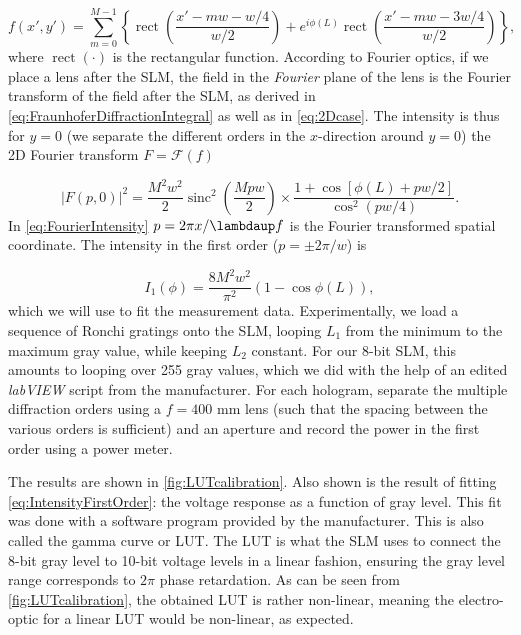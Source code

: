 \begin{equation}\label{eq:FieldAfterSLM}
    f(x',y') = \sum_{m=0}^{M-1} \left\{
    \operatorname{rect}\left(\frac{x'-m w - w/4}{w/2}\right) + e^{i \phi(L)} \operatorname{rect}\left(\frac{x'- m w - 3 w/4}{w/2}\right)
    \right\},
\end{equation}
where $\operatorname{rect}(\cdot)$ is the rectangular function. 
According to Fourier optics, if we place a lens after the SLM, the field in the \textit{Fourier} plane of the lens is the Fourier transform of the field after the SLM, as derived in \cref{eq:FraunhoferDiffractionIntegral} as well as in \cref{eq:2Dcase}.
The intensity is thus for $y=0$ (we separate the different orders in the $x$-direction around $y=0$) the 2D Fourier transform $F = \mathcal{F}(f)$ \cite{Zhang1994}

\begin{equation}\label{eq:FourierIntensity}
    |F(p,0)|^2=
    \frac{M^2 w^2}{2}\operatorname{sinc}^2\left(\frac{M p w}{2}\right) \times
    \frac{1 + \cos{\left[\phi(L)+p w/2\right]}}{\cos^2(p w/4)}.
\end{equation}
In \cref{eq:FourierIntensity} $p=2\pi x/\lambdaup f$ is the Fourier transformed spatial coordinate. The intensity in the first order ($p=\pm 2\pi/w$) is

\begin{equation}\label{eq:IntensityFirstOrder}
    I_1(\phi) =
    \frac{8M^2w^2}{\pi^2} \left( 
    1-\cos{\phi(L)}
    \right),
\end{equation}
which we will use to fit the measurement data. Experimentally, we load a sequence of Ronchi gratings onto the SLM, looping $L_1$ from the minimum to the maximum gray value, while keeping $L_2$ constant. 
For our 8-bit SLM, this amounts to looping over 255 gray values, which we did with the help of an edited \textit{labVIEW} script from the manufacturer.
For each hologram, separate the multiple diffraction orders using a $f=400$ mm lens (such that the spacing between the various orders is sufficient) and an aperture and record the power in the first order using a power meter.

The results are shown in \cref{fig:LUTcalibration}. 
Also shown is the result of fitting \cref{eq:IntensityFirstOrder}: the voltage response as a function of gray level. 
This fit was done with a software program provided by the manufacturer.
This is also called the gamma curve or \ac{LUT}.
The LUT is what the SLM uses to connect the 8-bit gray level to 10-bit voltage levels in a linear fashion, ensuring the gray level range corresponds to $2\pi$ phase retardation.
As can be seen from \cref{fig:LUTcalibration}, the obtained LUT is rather non-linear, meaning the electro-optic for a linear LUT would be non-linear, as expected. 

